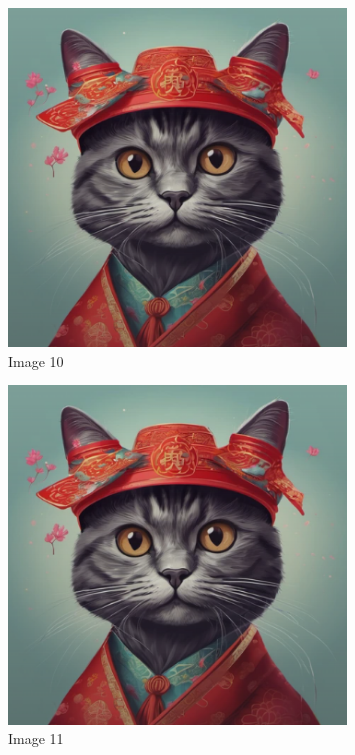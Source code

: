 \documentclass{article}%
\begin{document}
\begin{figure}[h!]%
\centering%
\includegraphics[width=0.8\textwidth]{source/image1.png}%
\caption{Image 10}%
\end{figure}

%


\begin{figure}[h!]%
\centering%
\includegraphics[width=0.8\textwidth]{source/image1.png}%
\caption{Image 11}%
\end{figure}

%
\end{document}
